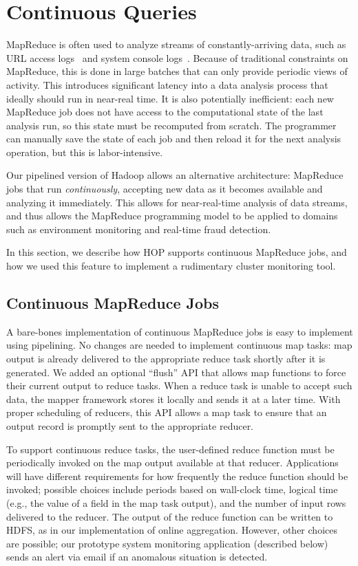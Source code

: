 \section{Continuous Queries}
\label{sec:continuous}

MapReduce is often used to analyze streams of constantly-arriving
data, such as URL access logs~\cite{mapreduce-osdi} and system console
logs~\cite{sosp-mining}. Because of traditional constraints on MapReduce, this 
is done in large batches that can only provide periodic views of activity.
This introduces
significant latency into a data analysis process that ideally should run in 
near-real time. It is also
potentially inefficient: each new MapReduce job does not have access
to the computational state of the last analysis run, so this state
must be recomputed from scratch. The programmer can manually save the
state of each job and then reload it for the next analysis operation,
but this is labor-intensive.

Our pipelined version of Hadoop allows an alternative architecture:
MapReduce jobs that run \emph{continuously}, accepting new data as it
becomes available and analyzing it immediately. This allows for near-real-time
analysis of data streams, and thus
allows the MapReduce programming model to be applied to domains such
as environment monitoring and real-time fraud detection.

In this section, we describe how HOP supports continuous MapReduce
jobs, and how we used this feature to implement a rudimentary
cluster monitoring tool.

\subsection{Continuous MapReduce Jobs}
A bare-bones implementation of continuous MapReduce jobs is easy to
implement using pipelining. No changes are needed to implement
continuous map tasks: map output is already delivered to the
appropriate reduce task shortly after it is generated. We added an
optional ``flush'' API that allows map functions to force their current
output to reduce tasks. When a reduce task is unable to accept such data, the mapper framework
stores it locally and sends it at a later time. 
With proper scheduling of reducers, this API allows a map task to ensure that an output record is promptly sent to the appropriate
reducer.

To support continuous reduce tasks, the user-defined reduce function
must be periodically invoked on the map output available at that
reducer. Applications will have different requirements for how
frequently the reduce function should be invoked; possible choices
include periods based on wall-clock time, logical time (e.g., the
value of a field in the map task output), and the number of input rows
delivered to the reducer. The output of the reduce function can be
written to HDFS, as in our implementation of online
aggregation. However, other choices are possible; our prototype system
monitoring application (described below) sends an alert via email if
an anomalous situation is detected.

